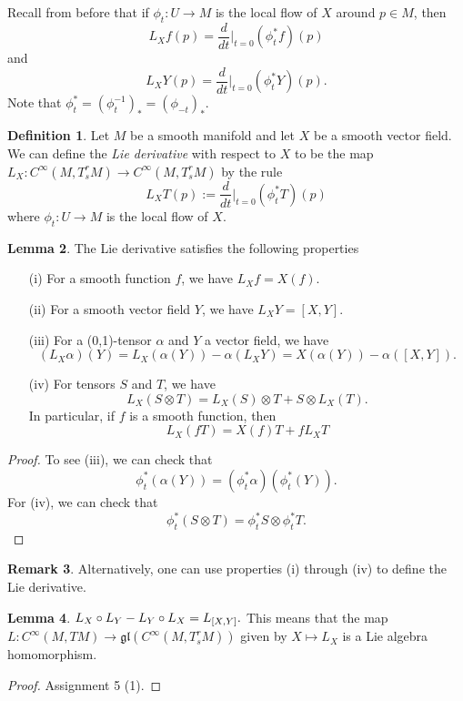 \documentclass{amsart}
\numberwithin{equation}{section}
\theoremstyle{definition}
\newtheorem{definition}{Definition} [section]
\newtheorem{remark}[definition]{Remark}
\theoremstyle{theorem}
\newtheorem{lemma}[definition]{Lemma}
\begin{document}
Recall from before that if $\phi_t : U \to M$ is the local flow of $X$ around $p \in M$, then 
\[
L_Xf(p) = \frac{d}{dt}\Big|_{t=0} (\phi_t^*f)(p)
\]
and 
\[
L_XY(p) = \frac{d}{dt}\Big|_{t=0}(\phi_t^*Y)(p).
\]
Note that $\phi_t^* = (\phi_t^{-1})_* =(\phi_{-t})_*$. 

\begin{definition}
Let $M$ be a smooth manifold and let $X$ be a smooth vector field. We can define the 
{\em Lie derivative} with respect to $X$ to be the map $L_X : C^\infty(M,T_s^rM) \to C^\infty(M,T_s^rM)$ by the rule 
\[
L_XT(p) := \frac{d}{dt}\Big|_{t=0}(\phi_t^*T)(p)
\]
where $\phi_t: U \to M$ is the local flow of $X$. 
\end{definition}

\begin{lemma}
The Lie derivative satisfies the following properties 
\begin{enumerate}
\item[(i)] For a smooth function $f$, we have $L_Xf = X(f)$.
\item[(ii)] For a smooth vector field $Y$, we have $L_XY = [X,Y]$. 
\item[(iii)] For a (0,1)-tensor $\alpha$ and $Y$ a vector field, we have 
\[
(L_X\alpha)(Y) = L_X(\alpha(Y)) - \alpha(L_XY) = X(\alpha(Y)) - \alpha([X,Y]).
\]
\item[(iv)] For tensors $S$ and $T$, we have 
\[
L_X(S \otimes T) = L_X(S) \otimes T + S \otimes L_X(T).
\]
In particular, if $f$ is a smooth function, then 
\[
L_X(fT) = X(f)T + fL_XT
\]
\end{enumerate}
\end{lemma}

\begin{proof}
To see (iii), we can check that 
\[
\phi_t^*(\alpha(Y)) = (\phi_t^*\alpha)(\phi_t^*(Y)).
\]
For (iv), we can check that 
\[
\phi_t^*(S \otimes T) = \phi_t^*S \otimes \phi_t^*T.
\]
\end{proof}

\begin{remark}
Alternatively, one can use properties (i) through (iv) to define the Lie derivative. 
\end{remark}

\begin{lemma}
$
L_X \circ L_Y - L_Y \circ L_X = L_{[X,Y]}. \\
$
This means that the map $L : C^\infty(M,TM) \to \mathfrak{gl}(C^\infty(M, T^r_sM))$ given by $X \mapsto L_X$  is a Lie algebra homomorphism. 
\end{lemma}
\begin{proof}
Assignment 5 (1).
\end{proof}
\end{document}
